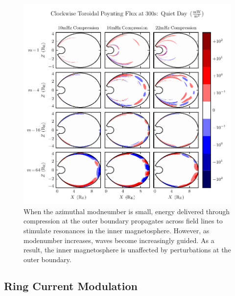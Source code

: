\begin{figure}[H]
    \centering
    \includegraphics[width=\textwidth]{figures/Stor_B_2.pdf}
    \caption[Decreasing Penetration with Increasing Modenumber]{
      When the azimuthal modneumber is small, energy delivered through compression at the outer boundary propagates across field lines to stimulate resonances in the inner magnetosphere. However, as modenumber increases, \Alfven waves become increasingly guided. As a result, the inner magnetosphere is unaffected by perturbations at the outer boundary. 
    }
    \label{fig_bdrive}
\end{figure}


\subsection{Ring Current Modulation}


